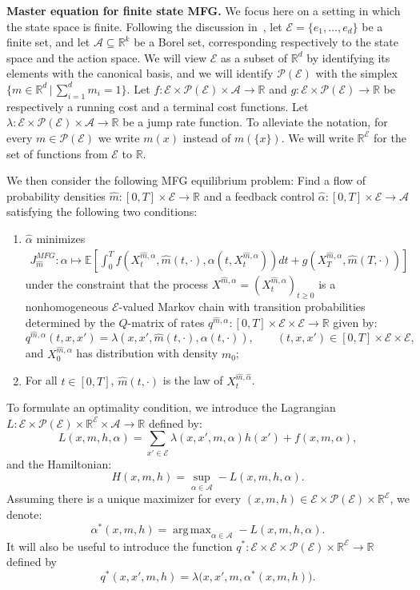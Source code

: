 \documentclass{amsproc}
\theoremstyle{definition}
\theoremstyle{remark}
\numberwithin{equation}{section}
\newcommand{\EE}{{\mathbb E}}
\newcommand{\RR}{{\mathbb R}}
\newcommand{\cA}{{\mathcal A}}
\newcommand{\cE}{{\mathcal E}}
\newcommand{\cP}{{\mathcal P}}
\newcommand{\ctrl}{\alpha}
\newcommand{\ctrldim}{k}
\DeclareMathOperator*{\argmax}{arg\,max}
\begin{document}
\textbf{Master equation for finite state MFG.} We focus here on a setting in which the state space is finite. Following the discussion in~\cite[Section 7.2]{MR3752669}, let $\cE = \{e_1, \dots, e_d\}$ be a finite set, and let $\cA \subseteq \RR^\ctrldim$ be a Borel set, corresponding respectively to the state space and the action space. We will view $\cE$ as a subset of $\RR^d$ by identifying its elements with the canonical basis, and we will identify $\cP(\cE)$ with the simplex $\{m \in \RR^d \,| \, \sum_{i=1}^d m_i = 1\}$. Let $f: \cE \times \cP(\cE) \times \cA \to \RR$ and  $g: \cE \times \cP(\cE) \to \RR$ be respectively a running cost and a terminal cost functions. Let $\lambda : \cE \times \cP(\cE) \times \cA \to \RR$ be a jump rate function. To alleviate the notation, for every $m \in \cP(\cE)$ we write $m(x)$ instead of $m(\{x\})$. We will write $\RR^\cE$ for the set of functions from $\cE$ to $\RR$.

We then consider the following MFG equilibrium problem: Find a flow of probability densities $\hat{m}: [0,T] \times \cE \to \RR$ and a feedback control $\hat{\ctrl}: [0,T] \times \cE \to \cA$ satisfying  the following two conditions:
\begin{enumerate}
	\item $\hat{\ctrl}$ minimizes
\begin{align*}
	J^{MFG}_{\hat{m}}: \ctrl \mapsto  \EE \left[\int_0^T f(X_t^{\hat{m}, \ctrl}, \hat{m}(t,\cdot), \ctrl(t,X_t^{\hat{m}, \ctrl}) ) dt + g(X_T^{\hat{m}, \ctrl}, \hat{m}(T,\cdot)) \right]
\end{align*}
under the constraint that the  process $X^{\hat{m}, \ctrl} = (X_t^{\hat{m}, \ctrl})_{t \ge 0}$ is a nonhomogeneous $\cE$-valued Markov chain with transition probabilities determined by the $Q$-matrix of rates $q^{\hat{m}, \ctrl}: [0,T] \times \cE \times \cE \to \RR$ given by:
\begin{equation}
\label{AMS-num-eq:q-finite-MFG}
	q^{\hat{m}, \ctrl}(t, x,x') = \lambda(x, x', \hat{m}(t,\cdot), \ctrl(t,\cdot)), \qquad (t,x,x') \in [0,T] \times \cE \times \cE,
\end{equation}
and $X_0^{\hat{m}, \ctrl}$ has distribution with density $m_0$;
	\item For all $t \in [0,T]$, $\hat{m}(t,\cdot)$ is the law of $X_t^{\hat{m}, \hat{\ctrl}}$.
\end{enumerate}

To formulate an optimality condition, we introduce the Lagrangian $L: \cE \times \cP(\cE) \times \RR^\cE \times \cA \to \RR$ defined by:
$$
	L(x, m, h, \ctrl) = \sum_{x' \in \cE} \lambda(x, x', m, \ctrl) h(x') + f(x, m, \ctrl) ,
$$
and the Hamiltonian:
$$
	H(x, m, h) = \sup_{\ctrl \in \cA} -L(x, m, h, \ctrl).
$$ 
Assuming there is a unique maximizer for every $(x, m, h) \in \cE \times \cP(\cE) \times \RR^\cE$, we denote:
\begin{equation}
\label{AMS-num-eq:finiteMFG-ctrl-argmax}
	\ctrl^*(x, m, h) = \argmax_{\ctrl \in \cA} -L(x, m, h, \ctrl).
\end{equation}
It will also be useful to introduce the function $q^*: \cE \times \cE \times \cP(\cE) \times \RR^\cE \to \RR$ defined by
$$
	q^*(x,x',m,h) = \lambda\big(x, x', m, \ctrl^*(x,m, h)\big).
$$
\end{document}
